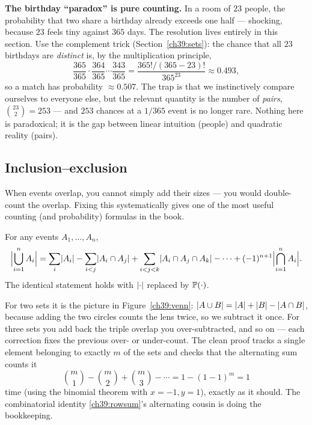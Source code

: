 \begin{paradoxbox}
\textbf{The birthday ``paradox'' is pure counting.} In a room of $23$
people, the probability that two share a birthday already exceeds one half ---
shocking, because $23$ feels tiny against $365$ days. The resolution lives
entirely in this section. Use the complement trick (Section~\ref{ch39:sets}):
the chance that all $23$ birthdays are \emph{distinct} is, by the
multiplication principle,
\[
  \frac{365}{365}\cdot\frac{364}{365}\cdots\frac{343}{365}
  = \frac{365!/(365-23)!}{365^{23}} \approx 0.493,
\]
so a match has probability $\approx 0.507$. The trap is that we instinctively
compare ourselves to everyone else, but the relevant quantity is the number of
\emph{pairs}, $\binom{23}{2} = 253$ --- and $253$ chances at a $1/365$ event
is no longer rare. Nothing here is paradoxical; it is the gap between linear
intuition (people) and quadratic reality (pairs).
\end{paradoxbox}

\subsection{Inclusion--exclusion}

When events overlap, you cannot simply add their sizes --- you would
double-count the overlap. Fixing this systematically gives one of the most
useful counting (and probability) formulas in the book.

\begin{theorem}
\label{ch39:incexc}
For any events $A_1,\dots,A_n$,
\[
  \abs[\Big]{\bigcup_{i=1}^n A_i}
  = \sum_i \abs{A_i} - \sum_{i<j}\abs{A_i \cap A_j}
  + \sum_{i<j<k}\abs{A_i \cap A_j \cap A_k} - \cdots
  + (-1)^{n+1}\abs[\Big]{\bigcap_{i=1}^n A_i}.
\]
The identical statement holds with $\abs{\cdot}$ replaced by $\P(\cdot)$.
\end{theorem}

\begin{whybox}
For two sets it is the picture in Figure~\ref{ch39:venn}: $\abs{A \cup B} =
\abs{A} + \abs{B} - \abs{A \cap B}$, because adding the two circles counts the
lens twice, so we subtract it once. For three sets you add back the triple
overlap you over-subtracted, and so on --- each correction fixes the previous
over- or under-count. The clean proof tracks a single element belonging to
exactly $m$ of the sets and checks that the alternating sum counts it
\[
  \binom{m}{1} - \binom{m}{2} + \binom{m}{3} - \cdots = 1 - (1-1)^m = 1
\]
time (using the binomial theorem with $x=-1,y=1$), exactly as it should. The
combinatorial identity \eqref{ch39:rowsum}'s alternating cousin is doing the
bookkeeping.
\end{whybox}

